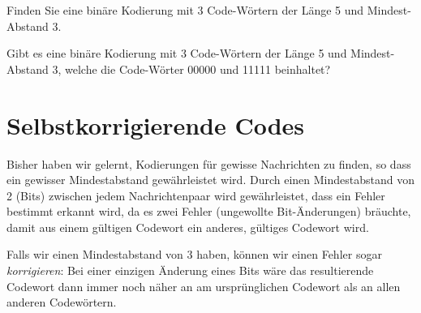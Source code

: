 \begin{mychallenge}\label{challenge:3code}
Finden Sie eine binäre Kodierung mit 3 Code-Wörtern der Länge 5 und Mindest-Abstand 3.
\end{mychallenge}

\begin{mychallenge}
Gibt es eine binäre Kodierung mit 3 Code-Wörtern der Länge 5 und Mindest-Abstand 3, welche die Code-Wörter 00000 und 11111 beinhaltet?
\end{mychallenge}



\section{Selbstkorrigierende Codes}

Bisher haben wir gelernt, Kodierungen für gewisse Nachrichten zu finden, so dass ein gewisser Mindestabstand gewährleistet wird. Durch einen Mindestabstand von 2 (Bits) zwischen jedem Nachrichtenpaar wird gewährleistet, dass ein Fehler bestimmt erkannt wird, da es zwei Fehler (ungewollte Bit-Änderungen) bräuchte, damit aus einem gültigen Codewort ein anderes, gültiges Codewort wird. 

Falls wir einen Mindestabstand von 3 haben, können wir einen Fehler sogar \textit{korrigieren}: Bei einer einzigen Änderung eines Bits wäre das resultierende Codewort dann immer noch näher an am ursprünglichen Codewort als an allen anderen Codewörtern.

